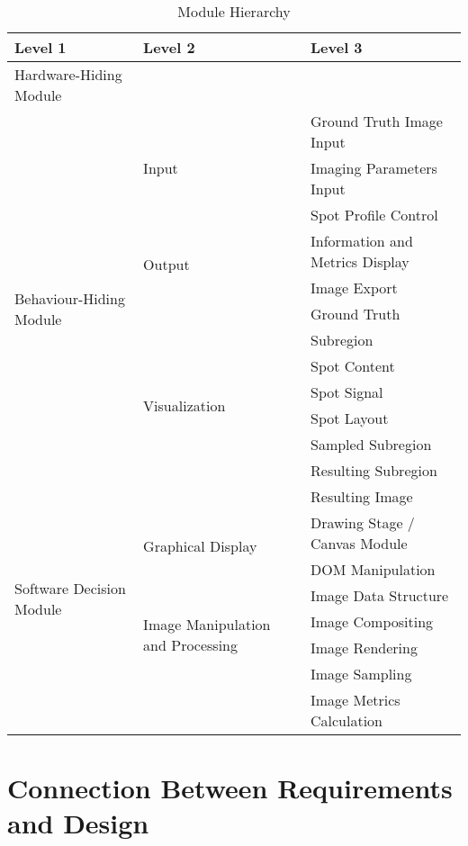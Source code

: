\documentclass[12pt, titlepage]{article}
\begin{document}
\begin{table}[h!]
\centering
\begin{tabular}{p{} p{} p{}}
\toprule
\textbf{Level 1} & \textbf{Level 2} & \textbf{Level 3}\\
\midrule

{Hardware-Hiding Module} & ~ \\
\midrule

\multirow{13}{0.3\textwidth}{Behaviour-Hiding Module}
& \multirow{3}{0.3\textwidth}{Input}
  & Ground Truth Image Input \\
  && Imaging Parameters Input \\
  && Spot Profile Control \\
  \cline{2-3}
& \multirow{2}{0.3\textwidth}{Output}
  & Information and Metrics Display \\
  && Image Export\\
  \cline{2-3}
& \multirow{8}{0.3\textwidth}{Visualization}
  & Ground Truth \\
  && Subregion \\
  && Spot Content \\
  && Spot Signal \\
  && Spot Layout \\
  && Sampled Subregion \\
  && Resulting Subregion \\
  && Resulting Image \\
\midrule

\multirow{6}{0.3\textwidth}{Software Decision Module}
& \multirow{2}{0.3\textwidth}{Graphical Display}
  & Drawing Stage / Canvas Module \\
  && DOM Manipulation \\
  \cline{2-3}
& \multirow{4}{0.3\textwidth}{Image Manipulation and Processing}
  & Image Data Structure \\
  && Image Compositing \\
  && Image Rendering \\
  && Image Sampling \\
  && Image Metrics Calculation \\
\bottomrule

\end{tabular}
\caption{Module Hierarchy}
\label{TblMH}
\end{table}

\section{Connection Between Requirements and Design} \label{SecConnection}
\end{document}
